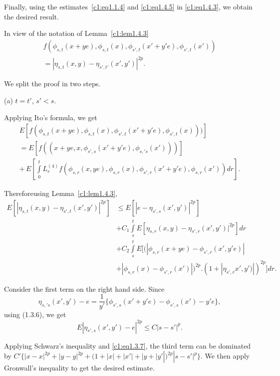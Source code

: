  Finally, using the estimates~\eqref{c1:eq1.1.4} and \eqref{c1:eq1.4.5} 
in \eqref{c1:eq1.4.3}, we obtain the desired result. 

\setcounter{proofofsublemma}{1}
\begin{proofofsublemma}\label{c1:prflem1.4.2} %
In view of the notation of Lemma~\ref{c1:lem1.4.3}
\begin{multline*}
  f(\phi_{s,t} {{(x + ye)}},\phi_{s,t}{{(x)}}, \phi_{s',t}{{(x'+y'e)}},
  \phi_{s',t}{{(x')}})\\ 
  =|\eta_{s,t}{{(x,y)}} - \eta_{s',t'}{{(x',y')}}|^{2p}.
\end{multline*}
 \end{proofofsublemma} 
 
We split the proof in two steps.

(a) $t = t'$, $s'< s$.

  Applying Ito's formula, we get
  \begin{multline*}
    E [f(\phi_{s,t} {{(x + ye)}},\phi_{s,t}{{(x)}},
      \phi_{s',t}{{(x'+y'e)}}, \phi_{s',t}{{(x)}}))] \\
    = E [f((x+ye,x,\phi_{s',s}{{(x'+y'e)}}, \phi_{s,'s}{{(x')}} ))]\\
    + \, E \left[\int\limits_0^t L^{(4)}_r  f(\phi_{s,r}
      {{(x,ye)}},\phi_{s,r}{{(x)}}, \phi_{s',r}{{(x'+y'e)}},
      \phi_{s,r}{{(x')}}) dr\right]. 
  \end{multline*}

Therefore\pageoriginale using Lemma~\ref{c1:lem1.4.3},
{\fontsize{10}{12}\selectfont
\begin{align*}
  E [|\eta _{s,t}{{(x,y)}} - \eta _{s',t}{{(x',y')}}|^{2p}]  & \le
  E[|e-\eta_{s',s}{{(x',y')}}|^{2p}]\\ 
  & + C_1 \int\limits_s^t E[\eta _{s,r}{{(x,y)}} - \eta _{s',r}{{(x',y')}}|^{2p}]dr\\
    & + C_2 \int\limits_s^t E[(|\phi_{s,r}{{(x+ye)}} -  \phi_{s',r}{{(x',y'e)}}|\\
    & +| \phi_{s,r}{{(x)}}-
    \phi_{s',r} {{(x')}}|)^{2p}. (1+|\eta_{s',r}{{x',y'}})|)^{2p}]dr.  
\end{align*}}\relax

Consider the first term on the right hand side. Since
$$
\eta_{s,'s}{{(x',y')}}-e = \frac{1}{y'} \{ \phi_{s',s}{{(x'+y'e)}}
-\phi_{s',s}{{(x')}}-y'e\}, 
$$
using (1.3.6), we get  
$$
E | \eta_{s',s}{{(x',y')}}-e|^{2p} \le C | s-s'|^p.
$$

Applying Schwarz's inequality and \eqref{c1:eq1.3.7}, the third term can be
dominated by $C'\{ |x-x|^{2p} + |y-y|^{2p} +
(1+|x|+|x'|+|y+|y'|)^{2p}|s-s'|^p\}$. We then apply Gronwall's
inequality to get the desired estimate. 

